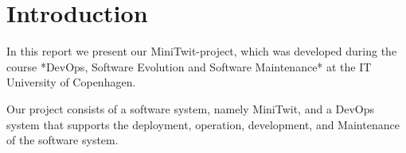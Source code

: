 \section*{Introduction}

In this report we present our MiniTwit-project, which was developed during the course *DevOps, Software Evolution and Software Maintenance* at the IT University of Copenhagen.

Our project consists of a software system, namely MiniTwit, and a DevOps system that supports the deployment, operation, development, and Maintenance of the software system.

